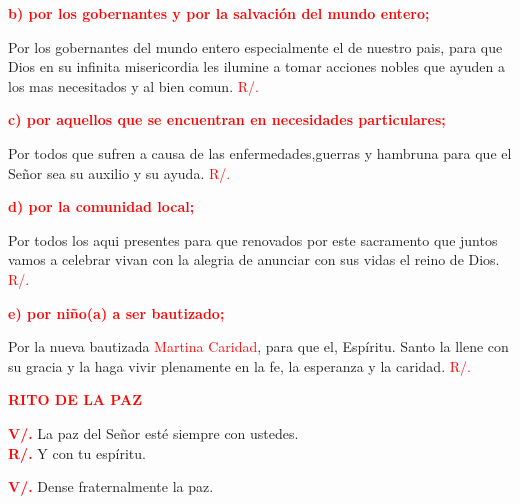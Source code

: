 \documentclass[12pt, letterpaper]{report}
\begin{document}
\large {\bfseries \textcolor{red}{b) por los gobernantes y por la salvaci\'on del mundo entero;}} \newline

\Large Por los gobernantes del mundo entero especialmente el de nuestro pais, para que Dios en su infinita misericordia les ilumine a tomar acciones nobles que ayuden a los mas necesitados y al bien comun. \hspace{1cm} \textcolor{red}{R/.}\newline

\large {\bfseries \textcolor{red}{c) por aquellos que se encuentran en necesidades particulares;}} \newline

\Large Por todos que sufren a causa de las enfermedades,guerras y hambruna para que el Se\~nor sea su auxilio y su ayuda. \hspace{1cm} \textcolor{red}{R/.}\newline

\large {\bfseries \textcolor{red}{d) por la comunidad local;}} \newline

\Large Por todos los aqui presentes para que renovados por este sacramento que juntos vamos a celebrar vivan con la alegria de anunciar con sus vidas el reino de Dios. \hspace{1cm} \textcolor{red}{R/.}\newline

\large {\bfseries \textcolor{red}{e) por ni\~no(a) a ser bautizado;}} \newline

\Large Por la nueva bautizada  \textcolor{red}{Martina Caridad}, para que el, Esp\'iritu. Santo la llene con su gracia y la haga vivir plenamente en la fe, la esperanza y la caridad. \hspace{1cm} \textcolor{red}{R/.}

\newpage

\Large {\bfseries \textcolor{red}{RITO DE LA PAZ}} \newline

\noindent
\Large {\bfseries \textcolor{red}{V/.}} \hspace{0.5cm} La paz del Se\~nor est\'e siempre con ustedes. \\
\Large {\bfseries \textcolor{red}{R/.}} \hspace{0.5cm} Y con tu esp\'iritu. \newline

\noindent
\Large {\bfseries \textcolor{red}{V/.}} \hspace{0.5cm} Dense fraternalmente la paz. \newline
\end{document}
